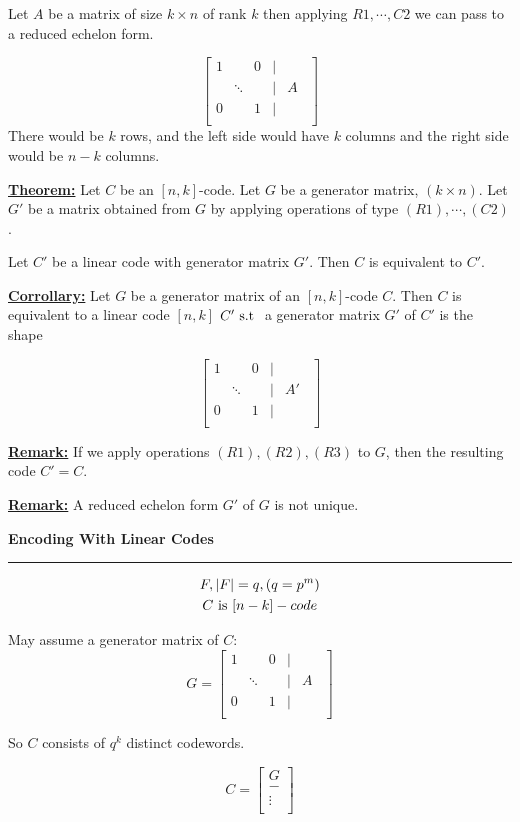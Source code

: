 \documentclass{article}
\newcommand{\header}[1]{
	\begin{Large}
	\noindent\textbf{#1}
	\vspace{2pt}
	\hrule
	\vspace{16pt}
	\end{Large}
	\normalsize
}
\newcommand{\eqs}[1]{
	\begin{gather*}
		#1
	\end{gather*}
}
\renewcommand{\b}[1]{\textbf{#1}}
\newcommand{\ul}[1]{\underline{#1}}
\newcommand{\newdef}[2]{\b{\ul{#1:}} #2}
\newcommand{\st}{\textnormal{ s.t }}
\begin{document}
Let $A$ be a matrix of size $k \times n$ of rank $k$ then applying
$R1, \cdots, C2$ we can pass to a reduced echelon form.

\[
	\begin{bmatrix}
		1 &        & 0 & | &      \\
		  & \ddots &   & | & A\ \ \\
		0 &        & 1 & | &      \\
	\end{bmatrix}
\]
There would be $k$ rows, and the left side would have $k$ columns and the right
side would be $n-k$ columns.

\newdef{Theorem}{
	Let $C$ be an $[n, k]$-code. Let $G$ be a generator matrix,
	$(k \times n)$. Let $G'$ be a matrix obtained from $G$ by applying
	operations of type $(R1), \cdots, (C2)$.

	Let $C'$ be a linear code with generator matrix $G'$. Then $C$ is
	equivalent to $C'$.
}

\newdef{Corrollary}{
	Let $G$ be a generator matrix of an $[n, k]$-code $C$. Then $C$ is
	equivalent to a linear code $[n, k]$ $C' \st$ a generator matrix $G'$
	of $C'$ is the shape

	\[
		\begin{bmatrix}
			1 &        & 0 & | &       \\
			  & \ddots &   & | & A'\ \ \\
			0 &        & 1 & | &       \\
		\end{bmatrix}
	\]
}

\newdef{Remark}{
	If we apply operations $(R1), (R2), (R3)$ to $G$, then the resulting
	code $C' = C$.
}

\newdef{Remark}{A reduced echelon form $G'$ of $G$ is not unique.}

\header{Encoding With Linear Codes}
\eqs{
	F, |F| = q, (q = p^m) \\
	C \textnormal{ is } [n-k]-code \\
}

May assume a generator matrix of $C$:
\[
	G = \begin{bmatrix}
		1 &        & 0 & | &      \\
		  & \ddots &   & | & A\ \ \\
		0 &        & 1 & | &      \\
	\end{bmatrix}
\]

So $C$ consists of $q^k$ distinct codewords.

\[
	C = \begin{bmatrix}
		G      \\
		-      \\
		\vdots \\
	\end{bmatrix}
\]
\end{document}

